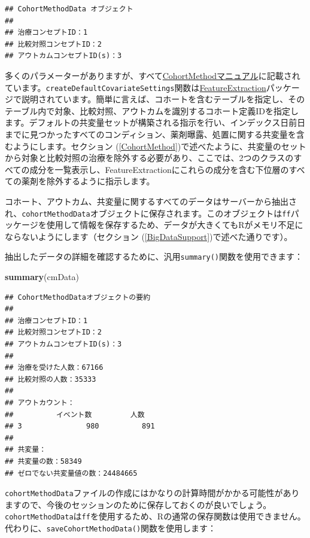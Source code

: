 \documentclass[
  11pt]{book}
\newenvironment{Shaded}{\begin{snugshade}}{\end{snugshade}}
\newcommand{\FunctionTok}[1]{\textcolor[rgb]{0.13,0.29,0.53}{\textbf{#1}}}
\newcommand{\NormalTok}[1]{#1}
\theoremstyle{definition}
\theoremstyle{definition}
\theoremstyle{definition}
\theoremstyle{definition}
\theoremstyle{remark}
\begin{document}
\begin{verbatim}
## CohortMethodData オブジェクト
## 
## 治療コンセプトID：1
## 比較対照コンセプトID：2
## アウトカムコンセプトID(s)：3
\end{verbatim}

多くのパラメーターがありますが、すべて\href{https://ohdsi.github.io/CohortMethod/reference/}{CohortMethodマニュアル}に記載されています。\texttt{createDefaultCovariateSettings}関数は\href{https://ohdsi.github.io/FeatureExtraction/}{FeatureExtraction}パッケージで説明されています。簡単に言えば、コホートを含むテーブルを指定し、そのテーブル内で対象、比較対照、アウトカムを識別するコホート定義IDを指定します。デフォルトの共変量セットが構築される指示を行い、インデックス日前日までに見つかったすべてのコンディション、薬剤曝露、処置に関する共変量を含むようにします。セクション (\ref{CohortMethod})で述べたように、共変量のセットから対象と比較対照の治療を除外する必要があり、ここでは、2つのクラスのすべての成分を一覧表示し、FeatureExtractionにこれらの成分を含む下位層のすべての薬剤を除外するように指示します。

コホート、アウトカム、共変量に関するすべてのデータはサーバーから抽出され、\texttt{cohortMethodData}オブジェクトに保存されます。このオブジェクトは\texttt{ff}パッケージを使用して情報を保存するため、データが大きくてもRがメモリ不足にならないようにします（セクション (\ref{BigDataSupport})で述べた通りです）。

抽出したデータの詳細を確認するために、汎用\texttt{summary()}関数を使用できます：

\begin{Shaded}
\begin{Highlighting}[]
\FunctionTok{summary}\NormalTok{(cmData)}
\end{Highlighting}
\end{Shaded}

\begin{verbatim}
## CohortMethodDataオブジェクトの要約
## 
## 治療コンセプトID：1
## 比較対照コンセプトID：2
## アウトカムコンセプトID(s)：3
## 
## 治療を受けた人数：67166
## 比較対照の人数：35333
## 
## アウトカウント：
##          イベント数         人数
## 3               980          891
## 
## 共変量：
## 共変量の数：58349
## ゼロでない共変量値の数：24484665
\end{verbatim}

\texttt{cohortMethodData}ファイルの作成にはかなりの計算時間がかかる可能性がありますので、今後のセッションのために保存しておくのが良いでしょう。\texttt{cohortMethodData}は\texttt{ff}を使用するため、Rの通常の保存関数は使用できません。代わりに、\texttt{saveCohortMethodData()}関数を使用します：
\end{document}
